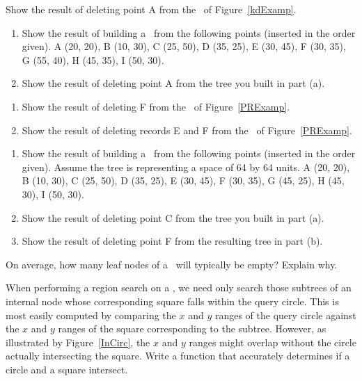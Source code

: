 \begin{exercises}
\item
Show the result of deleting point A from the \KDtree\ of
Figure~\ref{kdExamp}.

\item
\begin{enumerate}
\item
Show the result of building a \KDtree\ from the following points
(inserted in the order given).
A (20, 20), B (10, 30), C (25, 50), D (35, 25), E (30, 45),
F (30, 35), G (55, 40), H (45, 35), I (50, 30).
\item
Show the result of deleting point A from the tree you built in part (a).
\end{enumerate}

\item
\begin{enumerate}
\item Show the result of deleting F from the \PRquad\ of
Figure~\ref{PRExamp}.
\item Show the result of deleting records E and F from the \PRquad\ of
Figure~\ref{PRExamp}.
\end{enumerate}

\item
\begin{enumerate}
\label{PRExer}
\item
Show the result of building a \PRquad\ from the following points
(inserted in the order given).
Assume the tree is representing a space of 64 by 64 units.
A (20, 20), B (10, 30), C (25, 50), D (35, 25), E (30, 45),
F (30, 35), G (45, 25), H (45, 30), I (50, 30).
\item
Show the result of deleting point C from the tree you built in part
(a).
\item
Show the result of deleting point F from the resulting tree in part
(b).
\end{enumerate}

\item
On average, how many leaf nodes of a \PRquad\ will typically be empty?
Explain why.

\item
When performing a region search on a \PRquad, we need only search
those subtrees of an internal node whose corresponding square falls
within the query circle.
This is most easily computed by comparing the $x$ and $y$ ranges of
the query circle against the $x$ and $y$ ranges of the square
corresponding to the subtree.
However, as illustrated by Figure~\ref{InCirc}, the $x$ and $y$ ranges
might overlap without the circle actually intersecting the square.
Write a function that accurately determines if a circle and a square
intersect.


\end{exercises}
